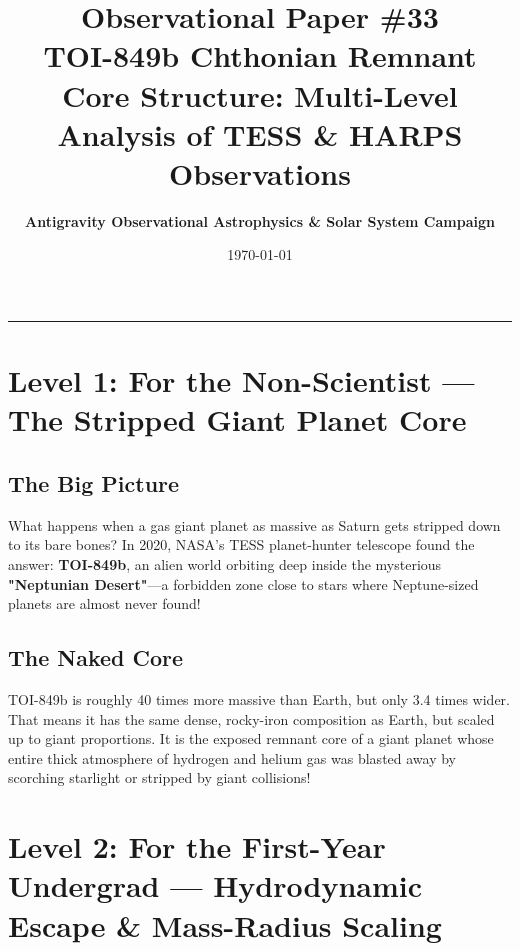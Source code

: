 \documentclass[11pt,a4paper]{article}
\title{\Huge \textbf{Observational Paper \#33}\\ \Large TOI-849b Chthonian Remnant Core Structure: Multi-Level Analysis of TESS \& HARPS Observations}
\author{\textbf{Antigravity Observational Astrophysics \& Solar System Campaign}}
\date{\today}
\begin{document}
\maketitle

\vspace{-1em}
\begin{center}
\rule{\textwidth}{1.5pt}
\end{center}

\section*{Level 1: For the Non-Scientist — The Stripped Giant Planet Core}

\subsection*{The Big Picture}
What happens when a gas giant planet as massive as Saturn gets stripped down to its bare bones? In 2020, NASA's TESS planet-hunter telescope found the answer: \textbf{TOI-849b}, an alien world orbiting deep inside the mysterious \textbf{"Neptunian Desert"}—a forbidden zone close to stars where Neptune-sized planets are almost never found!

\subsection*{The Naked Core}
TOI-849b is roughly 40 times more massive than Earth, but only 3.4 times wider. That means it has the same dense, rocky-iron composition as Earth, but scaled up to giant proportions. It is the exposed remnant core of a giant planet whose entire thick atmosphere of hydrogen and helium gas was blasted away by scorching starlight or stripped by giant collisions!

\newpage

\section*{Level 2: For the First-Year Undergrad — Hydrodynamic Escape \& Mass-Radius Scaling}
\end{document}
